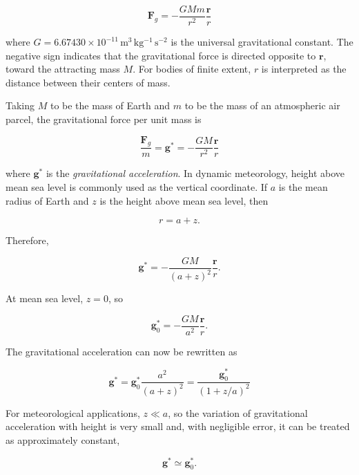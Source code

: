 \documentclass[10pt,twocolumn]{memoir}
\begin{document}
\begin{equation}
    \mathbf{F}_g = -\frac{GMm}{r^2}\frac{\mathbf{r}}{r}
\end{equation}

where $G = 6.67430\times10^{-11}\,\mathrm{m^3\,kg^{-1}\,s^{-2}}$ is the universal gravitational constant. The negative sign indicates that the gravitational force is directed opposite to $\mathbf{r}$, toward the attracting mass $M$. For bodies of finite extent, $r$ is interpreted as the distance between their centers of mass.

Taking $M$ to be the mass of Earth and $m$ to be the mass of an atmospheric air parcel, the gravitational force per unit mass is

\begin{equation}
    \frac{\mathbf{F}_g}{m} = \mathbf{g}^* = -\frac{GM}{r^2}\frac{\mathbf{r}}{r}
\end{equation}

where $\mathbf{g}^*$ is the \textit{gravitational acceleration}. In dynamic meteorology, height above mean sea level is commonly used as the vertical coordinate. If $a$ is the mean radius of Earth and $z$ is the height above mean sea level, then

\begin{equation}
    r = a+z.
\end{equation}

Therefore,

\begin{equation}
    \mathbf{g}^* = -\frac{GM}{(a+z)^2}\frac{\mathbf{r}}{r}.
\end{equation}

At mean sea level, $z=0$, so

\begin{equation}
    \mathbf{g}_0^* = -\frac{GM}{a^2}\frac{\mathbf{r}}{r}.
\end{equation}

The gravitational acceleration can now be rewritten as

\begin{equation}
    \mathbf{g}^* = \mathbf{g}_0^*\frac{a^2}{(a+z)^2} = \frac{\mathbf{g}_0^*}{(1+z/a)^2}
\end{equation}

For meteorological applications, $z\ll a$, so the variation of gravitational acceleration with height is very small and, with negligible error, it can be treated as approximately constant,

\begin{equation}
    \mathbf{g}^* \simeq \mathbf{g}_0^*.
\end{equation}
\end{document}
